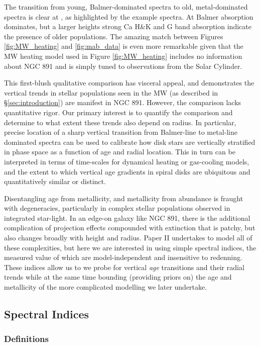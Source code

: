 The transition from young, Balmer-dominated spectra to
old, metal-dominated spectra is clear at , as
highlighted by the example spectra. At  Balmer
absorption dominates, but a larger heights strong Ca H\&K and G band
absorption indicate the presence of older populations.  The amazing
match between Figures \ref{fig:MW_heating} and \ref{fig:mab_data} is
even more remarkable given that the MW heating model used in Figure
\ref{fig:MW_heating} includes no information about NGC 891 and is
simply tuned to observations from the Solar Cylinder.

This first-blush qualitative comparison has visceral appeal, and
demonstrates the vertical trends in stellar populations seen in the MW
(as described in \S\ref{sec:introduction}) are manifest in NGC
891. However, the comparison lacks quantitative rigor.  Our primary
interest is to quantify the comparison and determine to what extent
these trends also depend on radius. In particular, precise location of
a sharp vertical transition from Balmer-line to metal-line dominated
spectra can be used to calibrate how disk stars are vertically
stratified in phase space as a function of age and radial
location. This in turn can be interpreted in terms of time-scales for
dynamical heating or gas-cooling models, and the extent to which
vertical age gradients in spiral disks are ubiquitous and
quantitatively similar or distinct.

Disentangling age from metallicity, and metallicity from abundance is
fraught with degeneracies, particularly in complex stellar populations
observed in integrated star-light. In an edge-on galaxy like NGC 891,
there is the additional complication of projection effects compounded
with extinction that is patchy, but also changes broadly with height
and radius. Paper II undertakes to model all of these complexities,
but here we are interested in using simple spectral indices, the
measured value of which are model-independent and insensitive to
redenning. These indices allow us to we probe for vertical {\it age}
transitions and their radial trends while at the same time bounding
(providing priors on) the age and metallicity of the more complicated
modelling we later undertake.

\subsection{Spectral Indices}
\label{sec:indices}

\subsubsection{Definitions}
\label{sec:index_defn}


